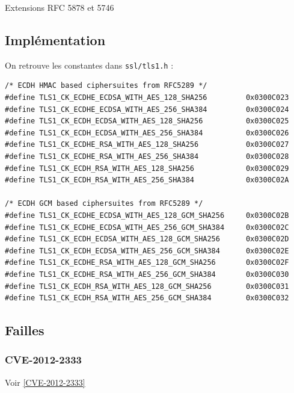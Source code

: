 \documentclass[a4paper,11pt,french]{article}
\begin{document}
Extensions RFC 5878 et 5746
\subsection{Implémentation}

On retrouve les constantes dans \verb+ssl/tls1.h+ :
\begin{verbatim}
/* ECDH HMAC based ciphersuites from RFC5289 */
#define TLS1_CK_ECDHE_ECDSA_WITH_AES_128_SHA256         0x0300C023
#define TLS1_CK_ECDHE_ECDSA_WITH_AES_256_SHA384         0x0300C024
#define TLS1_CK_ECDH_ECDSA_WITH_AES_128_SHA256          0x0300C025
#define TLS1_CK_ECDH_ECDSA_WITH_AES_256_SHA384          0x0300C026
#define TLS1_CK_ECDHE_RSA_WITH_AES_128_SHA256           0x0300C027
#define TLS1_CK_ECDHE_RSA_WITH_AES_256_SHA384           0x0300C028
#define TLS1_CK_ECDH_RSA_WITH_AES_128_SHA256            0x0300C029
#define TLS1_CK_ECDH_RSA_WITH_AES_256_SHA384            0x0300C02A

/* ECDH GCM based ciphersuites from RFC5289 */
#define TLS1_CK_ECDHE_ECDSA_WITH_AES_128_GCM_SHA256	    0x0300C02B
#define TLS1_CK_ECDHE_ECDSA_WITH_AES_256_GCM_SHA384	    0x0300C02C
#define TLS1_CK_ECDH_ECDSA_WITH_AES_128_GCM_SHA256      0x0300C02D
#define TLS1_CK_ECDH_ECDSA_WITH_AES_256_GCM_SHA384      0x0300C02E
#define TLS1_CK_ECDHE_RSA_WITH_AES_128_GCM_SHA256       0x0300C02F
#define TLS1_CK_ECDHE_RSA_WITH_AES_256_GCM_SHA384       0x0300C030
#define TLS1_CK_ECDH_RSA_WITH_AES_128_GCM_SHA256        0x0300C031
#define TLS1_CK_ECDH_RSA_WITH_AES_256_GCM_SHA384        0x0300C032
\end{verbatim}

\subsection{Failles}
\subsubsection{CVE-2012-2333}

Voir \ref{CVE-2012-2333}
\end{document}

